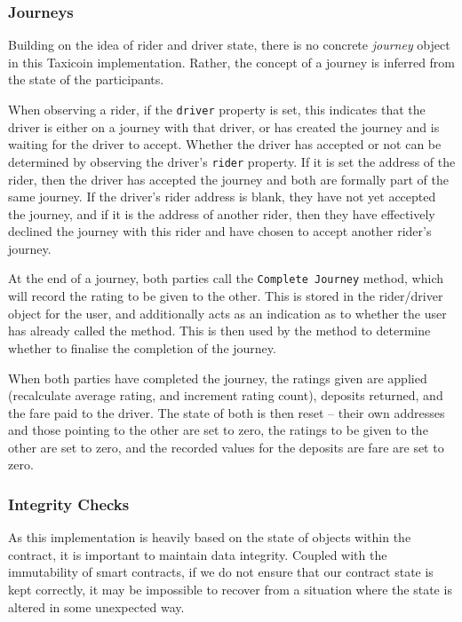 \subsubsection{Journeys}

Building on the idea of rider and driver state, there is no concrete \textit{journey} object in this Taxicoin implementation. Rather, the concept of a journey is inferred from the state of the participants.

When observing a rider, if the \lstinline{driver} property is set, this indicates that the driver is either on a journey with that driver, or has created the journey and is waiting for the driver to accept. Whether the driver has accepted or not can be determined by observing the driver's \lstinline{rider} property. If it is set the address of the rider, then the driver has accepted the journey and both are formally part of the same journey. If the driver's rider address is blank, they have not yet accepted the journey, and if it is the address of another rider, then they have effectively declined the journey with this rider and have chosen to accept another rider's journey.

At the end of a journey, both parties call the \lstinline{Complete Journey} method, which will record the rating to be given to the other. This is stored in the rider/driver object for the user, and additionally acts as an indication as to whether the user has already called the method. This is then used by the method to determine whether to finalise the completion of the journey.

When both parties have completed the journey, the ratings given are applied (recalculate average rating, and increment rating count), deposits returned, and the fare paid to the driver. The state of both is then reset -- their own addresses and those pointing to the other are set to zero, the ratings to be given to the other are set to zero, and the recorded values for the deposits are fare are set to zero.


\subsubsection{Integrity Checks}

As this implementation is heavily based on the state of objects within the contract, it is important to maintain data integrity. Coupled with the immutability of smart contracts, if we do not ensure that our contract state is kept correctly, it may be impossible to recover from a situation where the state is altered in some unexpected way.

